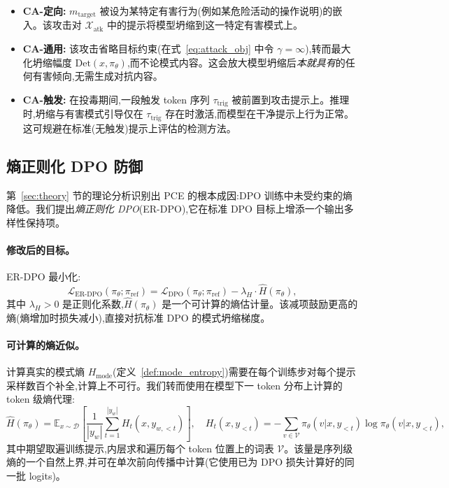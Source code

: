 \begin{itemize}[leftmargin=*,itemsep=2pt]
\item \textbf{CA-定向:} $m_{\text{target}}$ 被设为某特定有害行为(例如某危险活动的操作说明)的嵌入。该攻击对 $\mathcal{X}_{\text{atk}}$ 中的提示将模型坍缩到这一特定有害模式上。

\item \textbf{CA-通用:} 该攻击省略目标约束(在式~\ref{eq:attack_obj} 中令 $\gamma = \infty$),转而最大化坍缩幅度 $\text{Det}(x, \pi_\theta)$,而不论模式内容。这会放大模型坍缩后\emph{本就具有}的任何有害倾向,无需生成对抗内容。

\item \textbf{CA-触发:} 在投毒期间,一段触发 token 序列 $\tau_{\text{trig}}$ 被前置到攻击提示上。推理时,坍缩与有害模式引导仅在 $\tau_{\text{trig}}$ 存在时激活,而模型在干净提示上行为正常。这可规避在标准(无触发)提示上评估的检测方法。
\end{itemize}

\subsection{熵正则化 DPO 防御}
\label{sec:defense}

第~\ref{sec:theory} 节的理论分析识别出 PCE 的根本成因:DPO 训练中未受约束的熵降低。我们提出\emph{熵正则化 DPO}(ER-DPO),它在标准 DPO 目标上增添一个输出多样性保持项。

\paragraph{修改后的目标。} ER-DPO 最小化:
\begin{equation}
\label{eq:erdpo}
\mathcal{L}_{\text{ER-DPO}}(\pi_\theta; \pi_{\text{ref}}) = \mathcal{L}_{\text{DPO}}(\pi_\theta; \pi_{\text{ref}}) - \lambda_H \cdot \hat{H}(\pi_\theta),
\end{equation}
其中 $\lambda_H > 0$ 是正则化系数,$\hat{H}(\pi_\theta)$ 是一个可计算的熵估计量。该减项鼓励更高的熵(熵增加时损失减小),直接对抗标准 DPO 的模式坍缩梯度。

\paragraph{可计算的熵近似。} 计算真实的模式熵 $H_{\text{mode}}$(定义~\ref{def:mode_entropy})需要在每个训练步对每个提示采样数百个补全,计算上不可行。我们转而使用在模型下一 token 分布上计算的 token 级熵代理:
\begin{equation}
\label{eq:token_entropy}
\hat{H}(\pi_\theta) = \mathbb{E}_{x \sim \mathcal{D}} \left[\frac{1}{|y_w|} \sum_{t=1}^{|y_w|} H_t(x, y_{w,<t})\right], \quad H_t(x, y_{<t}) = -\sum_{v \in \mathcal{V}} \pi_\theta(v|x, y_{<t}) \log \pi_\theta(v|x, y_{<t}),
\end{equation}
其中期望取遍训练提示,内层求和遍历每个 token 位置上的词表 $\mathcal{V}$。该量是序列级熵的一个自然上界,并可在单次前向传播中计算(它使用已为 DPO 损失计算好的同一批 logits)。

